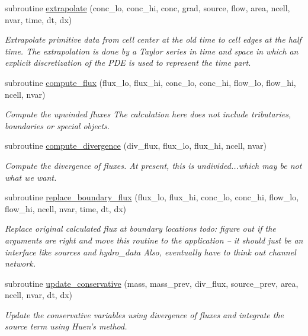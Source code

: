 \begin{CompactItemize}
subroutine \hyperlink{a00026_36ba824cb5dc6ca6127866376d2e79ec}{extrapolate} (conc\_\-lo, conc\_\-hi, conc, grad, source, flow, area, ncell, nvar, time, dt, dx)
\begin{CompactList}\small\item\em Extrapolate primitive data from cell center at the old time to cell edges at the half time. The extrapolation is done by a Taylor series in time and space in which an explicit discretization of the PDE is used to represent the time part. \item\end{CompactList}\item 
subroutine \hyperlink{a00026_3947a8a29b1c666b2d1b7223215e9873}{compute\_\-flux} (flux\_\-lo, flux\_\-hi, conc\_\-lo, conc\_\-hi, flow\_\-lo, flow\_\-hi, ncell, nvar)
\begin{CompactList}\small\item\em Compute the upwinded fluxes The calculation here does not include tributaries, boundaries or special objects. \item\end{CompactList}\item 
subroutine \hyperlink{a00026_aa34a3af6ce02dba4b6a11c1b38f51f0}{compute\_\-divergence} (div\_\-flux, flux\_\-lo, flux\_\-hi, ncell, nvar)
\begin{CompactList}\small\item\em Compute the divergence of fluxes. At present, this is undivided...which may be not what we want. \item\end{CompactList}\item 
subroutine \hyperlink{a00026_ce0b27ec0ac171c15a919d07fb3b32c3}{replace\_\-boundary\_\-flux} (flux\_\-lo, flux\_\-hi, conc\_\-lo, conc\_\-hi, flow\_\-lo, flow\_\-hi, ncell, nvar, time, dt, dx)
\begin{CompactList}\small\item\em Replace original calculated flux at boundary locations todo: figure out if the arguments are right and move this routine to the application -- it should just be an interface like sources and hydro\_\-data Also, eventually have to think out channel network. \item\end{CompactList}\item 
subroutine \hyperlink{a00026_3785ecc18bdbada28d0be139c7839690}{update\_\-conservative} (mass, mass\_\-prev, div\_\-flux, source\_\-prev, area, ncell, nvar, dt, dx)
\begin{CompactList}\small\item\em Update the conservative variables using divergence of fluxes and integrate the source term using Huen's method. \item\end{CompactList}\end{CompactItemize}


